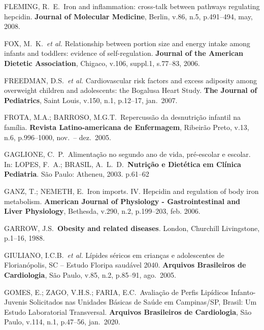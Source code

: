 \bigbreak

\noindent FLEMING, R.\ E.\ Iron and inflammation: cross-talk between pathways regulating hepcidin. \textbf{Journal of Molecular Medicine}, Berlin, v.86, n.5, p.491--494, may, 2008.

\bigbreak

\noindent FOX, M.\ K.\ \textit{et al.} Relationship between portion size and energy intake among infants and toddlers: evidence of self-regulation. \textbf{Journal of the American Dietetic Association}, Chigaco, v.106, suppl.1, s.77--83, 2006.

\bigbreak

\noindent FREEDMAN, D.S.\ \textit{et al.} Cardiovascular risk factors and excess adiposity among overweight children and adolescents: the Bogalusa Heart Study. \textbf{The Journal of Pediatrics}, Saint Louis, v.150, n.1, p.12--17, jan.\ 2007.

\bigbreak

\noindent FROTA, M.A.; BARROSO, M.G.T.\ Repercussão da desnutrição infantil na família. \textbf{Revista Latino-americana de Enfermagem}, Ribeirão Preto, v.13, n.6, p.996--1000, nov.\ – dez.\ 2005.

\bigbreak

\noindent GAGLIONE, C.\ P.\ Alimentação no segundo ano de vida, pré-escolar e escolar. In: LOPES, F.\ A.; BRASIL, A.\ L.\ D.\ \textbf{Nutrição e Dietética em Clínica Pediatria}. São Paulo: Atheneu, 2003. p.61--62 

\bigbreak

\noindent GANZ, T.; NEMETH, E.\ Iron imports. IV. Hepcidin and regulation of body iron metabolism. \textbf{American Journal of Physiology - Gastrointestinal and Liver Physiology}, Bethesda, v.290, n.2, p.199--203, feb. 2006.

\bigbreak

\noindent GARROW, J.S.\ \textbf{Obesity and related diseases}. London, Churchill Livingstone, p.1--16, 1988. 

\bigbreak

\noindent GIULIANO, I.C.B.\ \textit{et al.} Lípides séricos em crianças e adolescentes de Florianópolis, SC – Estudo Floripa saudável 2040. \textbf{Arquivos Brasileiros de Cardiologia}, São Paulo, v.85, n.2, p.85--91, ago.\ 2005.

\bigbreak

\noindent GOMES, E.; ZAGO, V.H.S.; FARIA, E.C.\ Avaliação de Perfis Lipídicos Infanto-Juvenis Solicitados nas Unidades Básicas de Saúde em Campinas/SP, Brasil: Um Estudo Laboratorial Transversal. \textbf{Arquivos Brasileiros de Cardiologia}, São Paulo, v.114, n.1, p.47--56, jan.\ 2020.

